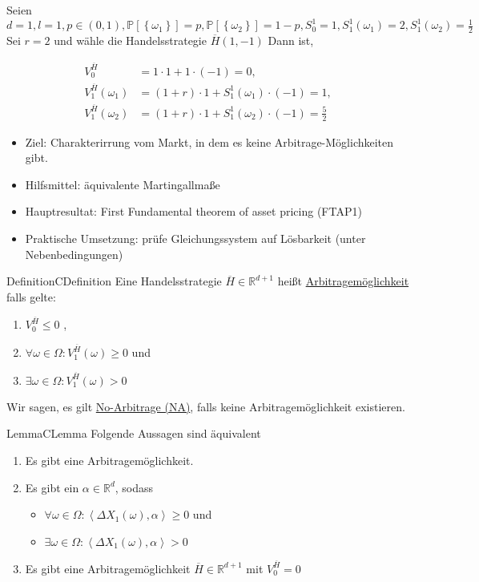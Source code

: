\documentclass[11.5 pt, a4paper]{memoir}
\begin{document}
Seien $ d =1 , l=1, p \in (0,1), \mathbb{P} \left[ \left\{ \omega_1 \right\}  \right] = p, \mathbb{P} \left[ \left\{ \omega_2 \right\}  \right] = 1-p, S_0^{1} = 1, S_1^1 (\omega_1) = 2, S_1^1 (\omega_2) = \frac{1}{2}  $
\break
Sei $ r=2 $ und wähle die Handelsstrategie $ \overline{ H} (1,-1)  $ Dann ist,

\begin{align*}
	V_0^{ \overline{ H} } &= 1 \cdot 1 + 1 \cdot (-1) = 0, \\
	V_1^{ \overline{ H} } (\omega_1) &= (1+r) \cdot 1 + S_1^1 (\omega_1) \cdot (-1) = 1, \\
	V_1^{ \overline{ H} } (\omega_2) &= (1+r) \cdot 1 + S_1^1 (\omega_2) \cdot (-1) = \frac{5}{2}
\end{align*}



\begin{itemize}
	\item Ziel: Charakterirrung vom Markt, in dem es keine Arbitrage-Möglichkeiten gibt.
	\item Hilfsmittel: äquivalente Martingallmaße
	\item Hauptresultat: First Fundamental theorem of asset pricing (FTAP1)
	\item Praktische Umsetzung: prüfe Gleichungssystem auf Lösbarkeit (unter Nebenbedingungen)
\end{itemize}

\begin{ibox}[2.1]{Definition}{CDefinition}
	Eine Handelsstrategie $ \overline{H} \in \mathbb{R}^{d+1} $ heißt \underline{Arbitragemöglichkeit} falls gelte:
	\begin{enumerate}[label=\alph*)]
		\item $ V^{ \overline{ H} }_0 \leq 0$ ,
		\item $ \forall \omega \in \Omega : V^{ \overline{H } }_{1}(\omega) \geq 0 $ und
		\item $ \exists \omega \in \Omega :  V^{ \overline{H } } _{1}(\omega) > 0  $ 
	\end{enumerate}
\end{ibox}
Wir sagen, es gilt \underline{No-Arbitrage (NA)}, falls keine Arbitragemöglichkeit existieren. 
\begin{ibox}[2.2]{Lemma}{CLemma}
    Folgende Aussagen sind äquivalent
		\begin{enumerate}[label=\alph*)]
			\item Es gibt eine Arbitragemöglichkeit.
			\item Es gibt ein $ \alpha \in \mathbb{R}^{d} $, sodass 
				\begin{itemize}
					\item $ \forall \omega \in \Omega : \left<\Delta X_1(\omega), \alpha \right> \geq 0 $  und 
					\item $ \exists \omega \in \Omega :  \left<\Delta X_1(\omega), \alpha \right> > 0  $ 
				\end{itemize}
			\item Es gibt eine Arbitragemöglichkeit $ \overline{ H} \in \mathbb{R}^{d+1}  $ mit $ V^{ \overline{ H} }_0 = 0 $ 	
		\end{enumerate}
\end{ibox}
\end{document}
